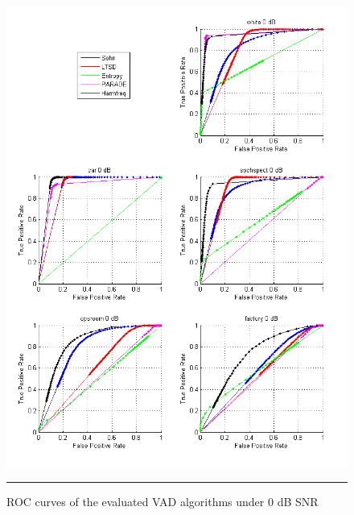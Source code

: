 \begin{figure}[htbp]
	\centering
		\includegraphics[width=1.0\columnwidth]{Figures/Chapter3/0dB.png}
		\rule{37em}{0.5pt}
	\caption[ROC curves of the evaluated VAD algorithms under 0 dB SNR]{ROC curves of the evaluated VAD algorithms under 0 dB SNR}
	\label{fig:0dB}
\end{figure}

